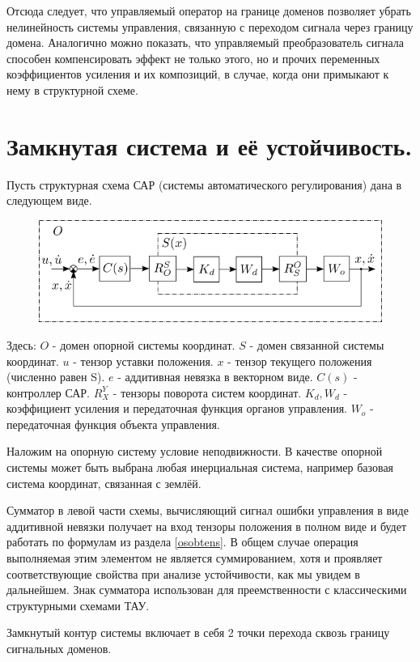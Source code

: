 \documentclass[a4paper]{article}
\begin{document}
Отсюда следует, что управляемый оператор на границе доменов позволяет убрать нелинейность системы управления, связанную с переходом сигнала через границу домена. Аналогично можно показать, что управляемый преобразователь сигнала способен компенсировать эффект не только этого, но и прочих переменных коэффициентов усиления и их композиций, в случае, когда они примыкают к нему в структурной схеме.

\section{Замкнутая система и её устойчивость.}
Пусть структурная схема САР (системы автоматического регулирования) дана в следующем виде.

{
\begin{figure}[H]
\centering
\includegraphics{./src/sheme.png}
\end{figure}
}

Здесь:
$O$ - домен опорной системы координат. 
$S$ - домен связанной системы координат.
$u$ - тензор уставки положения.
$x$ - тензор текущего положения (численно равен S).
$e$ - аддитивная невязка в векторном виде.
$C(s)$ - контроллер САР.
$R_X^Y$ - тензоры поворота систем координат.
$K_d, W_d$ - коэффициент усиления и передаточная функция органов управления.
$W_o$ - передаточная функция объекта управления.

Наложим на опорную систему условие неподвижности. В качестве опорной системы может быть выбрана любая инерциальная система, например базовая система координат, связанная с землёй.

Сумматор в левой части схемы, вычисляющий сигнал ошибки управления в виде аддитивной невязки получает на вход тензоры положения в полном виде и будет работать по формулам из раздела \ref{osobtens}. В общем случае операция выполняемая этим элементом не является суммированием, хотя и проявляет соответствующие свойства при анализе устойчивости, как мы увидем в дальнейшем. Знак сумматора использован для преемственности с классическими структурными схемами ТАУ.

Замкнутый контур системы включает в себя 2 точки перехода сквозь границу сигнальных доменов.
\end{document}
